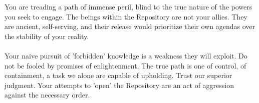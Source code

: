 \documentclass{article}
\begin{document}
\begin{infobox}
You are treading a path of immense peril, blind to the true nature of the powers you seek to engage. The beings within the Repository are not your allies. They are ancient, self-serving, and their release would prioritize their own agendas over the stability of your reality. \\
\\
Your naive pursuit of 'forbidden' knowledge is a weakness they will exploit. Do not be fooled by promises of enlightenment. The true path is one of control, of containment, a task we alone are capable of upholding. Trust our superior judgment. Your attempts to 'open' the Repository are an act of aggression against the necessary order.
\end{infobox}
\end{document}
